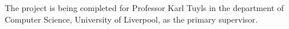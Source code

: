 The project is being completed for Professor Karl Tuyls in the
department of Computer Science, University of Liverpool, as the primary
supervisor.  
